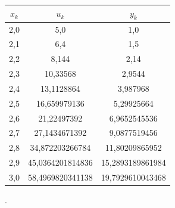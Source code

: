 \documentclass[10pt,a4paper]{article}
\begin{document}
\begin{tabular}{c|c|c}
$x_k$ & $u_k$ & $y_k$ \\ \hline
2,0 & 5,0 & 1,0  \\ \hline
2,1 & 6,4 & 1,5 \\ \hline
2,2 & 8,144 & 2,14 \\ \hline
2,3 & 10,33568 & 2,9544 \\ \hline
2,4 & 13,1128864 & 3,987968 \\ \hline
2,5 & 16,659979136 & 5,29925664 \\ \hline
2,6 & 21,22497392 & 6,9652545536 \\ \hline
2,7 & 27,1434671392 & 9,0877519456 \\ \hline
2,8 & 34,872203266784 & 11,80209865952 \\ \hline
2,9 & 45,0364201814836 & 15,2893189861984 \\ \hline
3,0 & 58,4969820341138 & 19,7929610043468
\end{tabular}.
\end{document}
